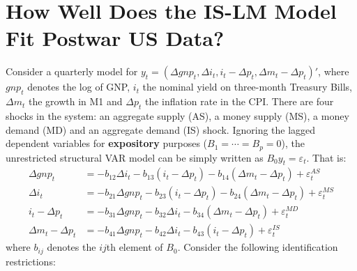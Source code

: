 \section[How Well Does the IS-LM Model Fit Postwar US Data]{How Well Does the IS-LM Model Fit Postwar US Data?\label{ex:svarISLM}}
Consider a quarterly model for \(y_t = (\Delta gnp_t, \Delta i_t, i_t-\Delta p_t, \Delta m_t - \Delta p_t)'\),
  where \(gnp_t\) denotes the log of GNP, \(i_t\) the nominal yield on three-month Treasury Bills,
  \(\Delta m_t\) the growth in M1 and \(\Delta p_t\) the inflation rate in the CPI\@.
There are four shocks in the system: an aggregate supply (AS), a money supply (MS), a money demand (MD) and an aggregate demand (IS) shock.
Ignoring the lagged dependent variables for \textbf{expository} purposes (\(B_1=\cdots =B_p=0\)),
  the unrestricted structural VAR model can be simply written as \(B_0 y_t = \varepsilon_t\). That is:
\begin{align}
\Delta gnp_t &= -b_{12}\Delta i_t -b_{13}(i_t-\Delta p_t) -b_{14}(\Delta m_t-\Delta p_t) + \varepsilon_t^{AS} \label{eq:AS}\\
\Delta i_t &= -b_{21}\Delta gnp_t -b_{23}(i_t-\Delta p_t) -b_{24}(\Delta m_t-\Delta p_t) + \varepsilon_t^{MS} \label{eq:MS}\\
i_t - \Delta p_t &= -b_{31}\Delta gnp_t -b_{32}\Delta i_t -b_{34}(\Delta m_t-\Delta p_t) + \varepsilon_t^{MD} \label{eq:MD}\\
\Delta m_t - \Delta p_t &= -b_{41}\Delta gnp_t -b_{42}\Delta i_t - b_{43} (i_t-\Delta p_t) + \varepsilon_t^{IS} \label{eq:IS}
\end{align}
where \(b_{ij}\) denotes the \(ij\)th element of \(B_0\).
Consider the following identification restrictions:
